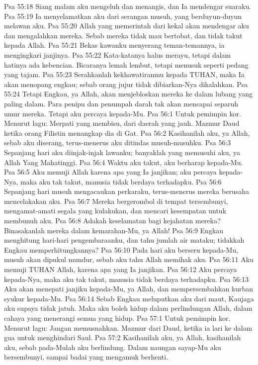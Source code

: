 Psa 55:18  Siang malam aku mengeluh dan menangis, dan Ia mendengar suaraku.
Psa 55:19  Ia menyelamatkan aku dari serangan musuh, yang berduyun-duyun melawan aku.
Psa 55:20  Allah yang memerintah dari kekal akan mendengar aku dan mengalahkan mereka. Sebab mereka tidak mau bertobat, dan tidak takut kepada Allah.
Psa 55:21  Bekas kawanku menyerang teman-temannya, ia mengingkari janjinya.
Psa 55:22  Kata-katanya halus merayu, tetapi dalam hatinya ada kebencian. Bicaranya lemah lembut, tetapi menusuk seperti pedang yang tajam.
Psa 55:23  Serahkanlah kekhawatiranmu kepada TUHAN, maka Ia akan menopang engkau; sebab orang jujur tidak dibiarkan-Nya dikalahkan.
Psa 55:24  Tetapi Engkau, ya Allah, akan menjebloskan mereka ke dalam lubang yang paling dalam. Para penipu dan penumpah darah tak akan mencapai separuh umur mereka. Tetapi aku percaya kepada-Mu.
Psa 56:1  Untuk pemimpin kor. Menurut lagu: Merpati yang membisu, dari daerah yang jauh. Mazmur Daud ketika orang Filistin menangkap dia di Gat.
Psa 56:2  Kasihanilah aku, ya Allah, sebab aku diserang, terus-menerus aku ditindas musuh-musuhku.
Psa 56:3  Sepanjang hari aku diinjak-injak lawanku; banyaklah yang memusuhi aku, ya Allah Yang Mahatinggi.
Psa 56:4  Waktu aku takut, aku berharap kepada-Mu.
Psa 56:5  Aku memuji Allah karena apa yang Ia janjikan; aku percaya kepada-Nya, maka aku tak takut, manusia tidak berdaya terhadapku.
Psa 56:6  Sepanjang hari musuh mengacaukan perkaraku, terus-menerus mereka berusaha mencelakakan aku.
Psa 56:7  Mereka bergerombol di tempat tersembunyi, mengamat-amati segala yang kulakukan, dan mencari kesempatan untuk membunuh aku.
Psa 56:8  Adakah keselamatan bagi kejahatan mereka? Binasakanlah mereka dalam kemarahan-Mu, ya Allah!
Psa 56:9  Engkau menghitung hari-hari pengembaraanku, dan tahu jumlah air mataku; tidakkah Engkau memperhitungkannya?
Psa 56:10  Pada hari aku berseru kepada-Mu, musuh akan dipukul mundur, sebab aku tahu Allah memihak aku.
Psa 56:11  Aku memuji TUHAN Allah, karena apa yang Ia janjikan.
Psa 56:12  Aku percaya kepada-Nya, maka aku tak takut, manusia tidak berdaya terhadapku.
Psa 56:13  Aku akan menepati janjiku kepada-Mu, ya Allah, dan mempersembahkan kurban syukur kepada-Mu.
Psa 56:14  Sebab Engkau meluputkan aku dari maut, Kaujaga aku supaya tidak jatuh. Maka aku boleh hidup dalam perlindungan Allah, dalam cahaya yang menerangi semua yang hidup.
Psa 57:1  Untuk pemimpin kor. Menurut lagu: Jangan memusnahkan. Mazmur dari Daud, ketika ia lari ke dalam gua untuk menghindari Saul.
Psa 57:2  Kasihanilah aku, ya Allah, kasihanilah aku, sebab pada-Mulah aku berlindung. Dalam naungan sayap-Mu aku bersembunyi, sampai badai yang mengamuk berhenti.
